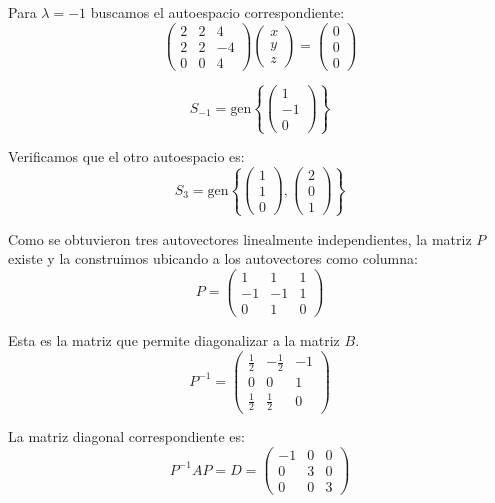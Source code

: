 \begin{}
\begin{example}
Para \( \lambda = -1 \) buscamos el autoespacio correspondiente:
\[ \begin{pmatrix}
2 & 2 & 4 \\
2 & 2 & -4 \\
0 & 0 & 4
\end{pmatrix} \begin{pmatrix} x \\ y \\ z \end{pmatrix} = \begin{pmatrix} 0 \\ 0 \\ 0 \end{pmatrix} \]

\[ S_{-1} = \text{gen} \left\{ \begin{pmatrix} 1 \\ -1 \\ 0 \end{pmatrix} \right\} \]

Verificamos que el otro autoespacio es:
\[ S_3 = \text{gen} \left\{ \begin{pmatrix} 1 \\ 1 \\ 0 \end{pmatrix}, \begin{pmatrix} 2 \\ 0 \\ 1 \end{pmatrix} \right\} \]

Como se obtuvieron  tres autovectores linealmente independientes, la matriz \( P \) existe y la construimos ubicando a los autovectores como columna:
\[ P = \begin{pmatrix}
1 & 1 & 1 \\
-1 & -1 & 1 \\
0 & 1 & 0
\end{pmatrix} \]

Esta es la matriz que permite diagonalizar a la matriz \( B \).
\[ P^{-1} = \begin{pmatrix}
\frac{1}{2} & -{\frac{1}{2}} & -1 \\
0 & 0 & 1\\
\frac{1}{2} & \frac{1}{2} & 0
\end{pmatrix} \]

La matriz diagonal correspondiente es:
\[ P^{-1} A P = D = \begin{pmatrix}
-1 & 0 & 0 \\
0 & 3 & 0 \\
0 & 0 & 3
\end{pmatrix} \]


\end{example}
\end{}
